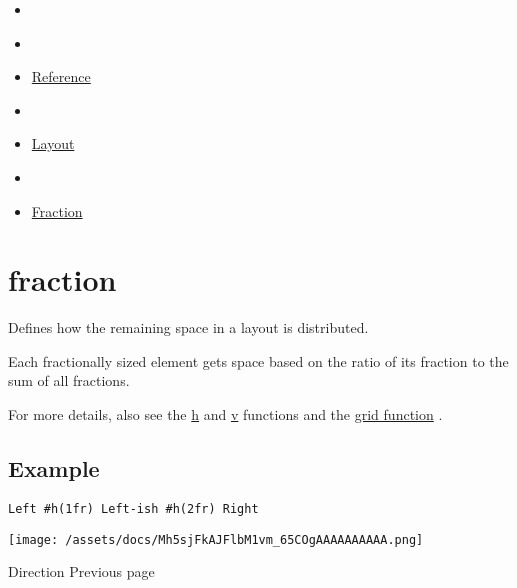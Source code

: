 \begin{itemize}
\tightlist
\item
  \href{/docs}{}
\item
  
\item
  \href{/docs/reference/}{Reference}
\item
  
\item
  \href{/docs/reference/layout/}{Layout}
\item
  
\item
  \href{/docs/reference/layout/fraction/}{Fraction}
\end{itemize}

\section{\texorpdfstring{{ fraction }}{ fraction }}\label{summary}

Defines how the remaining space in a layout is distributed.

Each fractionally sized element gets space based on the ratio of its
fraction to the sum of all fractions.

For more details, also see the \href{/docs/reference/layout/h/}{h} and
\href{/docs/reference/layout/v/}{v} functions and the
\href{/docs/reference/layout/grid/}{grid function} .

\subsection{Example}\label{example}

\begin{verbatim}
Left #h(1fr) Left-ish #h(2fr) Right
\end{verbatim}

\texttt{[image: /assets/docs/Mh5sjFkAJFlbM1vm\_65COgAAAAAAAAAA.png]}

\href{/docs/reference/layout/direction/}{\pandocbounded{}}

{ Direction } { Previous page }

\href{/docs/reference/layout/grid/}{\pandocbounded{}}

